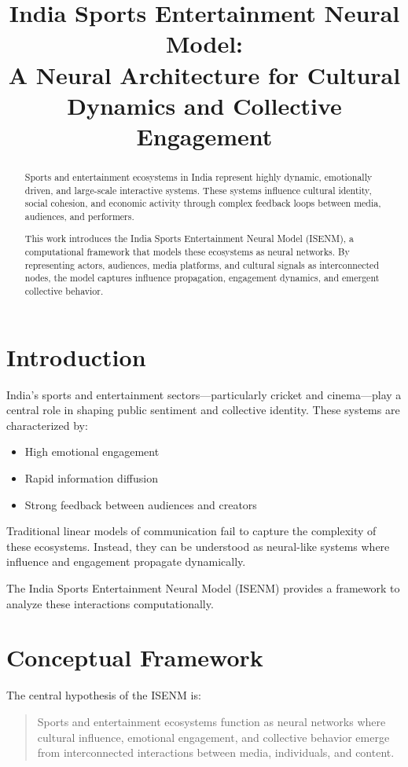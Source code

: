 \documentclass[12pt]{article}
\title{\textbf{India Sports Entertainment Neural Model: \\ A Neural Architecture for Cultural Dynamics and Collective Engagement}}
\author{}
\date{}
\begin{document}
\maketitle

\begin{abstract}
Sports and entertainment ecosystems in India represent highly dynamic, emotionally driven, and large-scale interactive systems. These systems influence cultural identity, social cohesion, and economic activity through complex feedback loops between media, audiences, and performers.

This work introduces the India Sports Entertainment Neural Model (ISENM), a computational framework that models these ecosystems as neural networks. By representing actors, audiences, media platforms, and cultural signals as interconnected nodes, the model captures influence propagation, engagement dynamics, and emergent collective behavior.
\end{abstract}

\section{Introduction}

India’s sports and entertainment sectors—particularly cricket and cinema—play a central role in shaping public sentiment and collective identity. These systems are characterized by:

\begin{itemize}
\item High emotional engagement
\item Rapid information diffusion
\item Strong feedback between audiences and creators
\end{itemize}

Traditional linear models of communication fail to capture the complexity of these ecosystems. Instead, they can be understood as neural-like systems where influence and engagement propagate dynamically.

The India Sports Entertainment Neural Model (ISENM) provides a framework to analyze these interactions computationally.

\section{Conceptual Framework}

The central hypothesis of the ISENM is:

\begin{quote}
Sports and entertainment ecosystems function as neural networks where cultural influence, emotional engagement, and collective behavior emerge from interconnected interactions between media, individuals, and content.
\end{quote}
\end{document}
